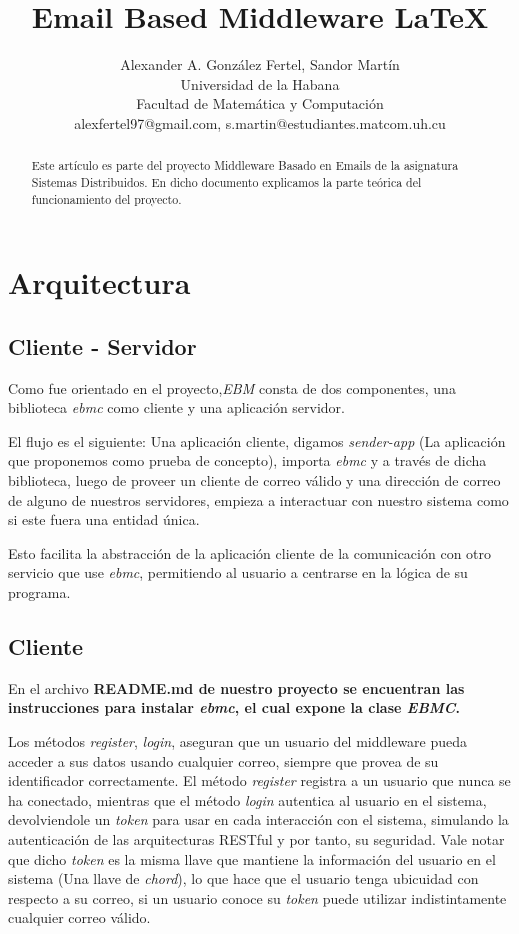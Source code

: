 \documentclass[a4paper]{article}
\title{Email Based Middleware \LaTeX}
\author{Alexander A. González Fertel, Sandor Martín \\
  \small Universidad de la Habana\\
  \small Facultad de Matemática y Computación\\
  \small alexfertel97@gmail.com, s.martin@estudiantes.matcom.uh.cu
  \date{}
}
\begin{document}
\maketitle

\begin{abstract}
	
Este artículo es parte del proyecto Middleware Basado en Emails de la asignatura Sistemas Distribuidos.
En dicho documento explicamos la parte teórica del funcionamiento del proyecto.

\end{abstract}

\section{Arquitectura}
	\subsection{Cliente - Servidor}
	Como fue orientado en el proyecto,\emph{EBM} consta de dos componentes, una biblioteca \emph{ebmc} como cliente y una aplicación servidor.
	
	El flujo es el siguiente: Una aplicación cliente, digamos \emph{sender-app} (La aplicación que proponemos como prueba de concepto), importa \emph{ebmc} y a través de dicha biblioteca, luego de proveer un cliente de correo válido y una dirección de correo de alguno de nuestros servidores, empieza a interactuar con nuestro sistema como si este fuera una entidad única.
	
	Esto facilita la abstracción de la aplicación cliente de la comunicación con otro servicio que use \emph{ebmc}, permitiendo al usuario a centrarse en la lógica de su programa.
	
	\subsection{Cliente}
	En el archivo \bfseries{README.md} de nuestro proyecto se encuentran las instrucciones para instalar \emph{ebmc}, el cual expone la clase \emph{EBMC}.
	
	Los métodos \emph{register}, \emph{login}, aseguran que un usuario del middleware pueda acceder a sus datos usando cualquier correo, siempre que provea de su identificador correctamente. El método \emph{register} registra a un usuario que nunca se ha conectado, mientras que el método \emph{login} autentica al usuario en el sistema, devolviendole un \emph{token} para usar en cada interacción con el sistema, simulando la autenticación de las arquitecturas RESTful y por tanto, su seguridad. Vale notar que dicho \emph{token} es la misma llave que mantiene la información del usuario en el sistema (Una llave de \emph{chord}), lo que hace que el usuario tenga ubicuidad con respecto a su correo, si un usuario conoce su \emph{token} puede utilizar indistintamente cualquier correo válido.
	
\end{document}
